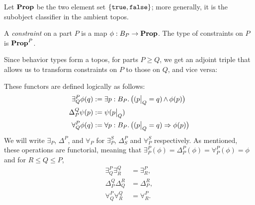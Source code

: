 Let $\operatorname{\textbf{Prop}}$ be the two element set $\{\mathtt{true},\mathtt{false}\}$; more generally, it is the subobject classifier in the ambient topos. 
\begin{defn}
A \emph{constraint} on a part $P$ is a map $\phi : B_P \to \operatorname{\textbf{Prop}}$. The type of constraints on $P$ is $\operatorname{\textbf{Prop}}^P$.
\end{defn}

Since behavior types form a topos, for parts $P\geq Q$, we get an adjoint triple that allows us to transform constraints on $P$ to those on $Q$, and vice versa:
    \begin{center}
    \end{center}
These functors are defined logically as follows:
\begin{align*}
    \exists^P_Q \phi(q) &:= \exists p : B_P.\, \big((p\big|_{Q} = q) \operatorname{\wedge} \phi(p)\big) \\
    \Delta^Q_P \psi(p) &:= \psi(p\big|_{Q}) \\
    \forall^P_Q \phi(q) &:= \forall p : B_P.\, \big((p\big|_{Q} = q) \Rightarrow \phi(p)\big)
\end{align*}
We will write $\exists_P$, $\Delta^P$, and $\forall_P$ for $\exists^S_P$, $\Delta^P_S$ and $\forall^S_P$ respectively. As mentioned, these operations are functorial, meaning that $\exists^P_P(\phi)=\Delta^P_P(\phi)=\forall^P_P(\phi)=\phi$ and for $R \leq Q \leq P$,
\begin{align*}
    \exists^P_Q \exists^Q_R &= \exists^P_R, \\
    \Delta^Q_P \Delta^R_Q &= \Delta^R_P, \\
    \forall^P_Q \forall^Q_R &= \forall^P_R.
\end{align*}

